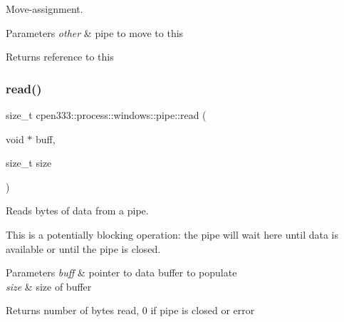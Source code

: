 Move-\/assignment. 


\begin{DoxyParams}{Parameters}
{\em other} & pipe to move to this \\
\hline
\end{DoxyParams}
\begin{DoxyReturn}{Returns}
reference to this 
\end{DoxyReturn}
\mbox{\label{classcpen333_1_1process_1_1windows_1_1pipe_a3cb456794637be1845cdeca693dc27d0}} 
\subsubsection{\texorpdfstring{read()}{read()}}
{\footnotesize\ttfamily size\+\_\+t cpen333\+::process\+::windows\+::pipe\+::read (\begin{DoxyParamCaption}\item[{void $\ast$}]{buff,  }\item[{size\+\_\+t}]{size }\end{DoxyParamCaption})\hspace{0.3cm}{\ttfamily [inline]}}



Reads bytes of data from a pipe. 

This is a potentially blocking operation\+: the pipe will wait here until data is available or until the pipe is closed.


\begin{DoxyParams}{Parameters}
{\em buff} & pointer to data buffer to populate \\
\hline
{\em size} & size of buffer \\
\hline
\end{DoxyParams}
\begin{DoxyReturn}{Returns}
number of bytes read, 0 if pipe is closed or error 
\end{DoxyReturn}
\mbox{\label{classcpen333_1_1process_1_1windows_1_1pipe_a4aafcae5f14f971f112ec00601f55601}} 
